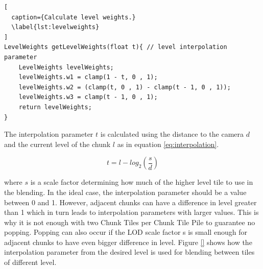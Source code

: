 \begin{lstlisting}[
  caption={Calculate level weights.} 
  \label{lst:levelweights}
]
LevelWeights getLevelWeights(float t){ // level interpolation parameter
	LevelWeights levelWeights;
	levelWeights.w1 = clamp(1 - t, 0 , 1);
	levelWeights.w2 = (clamp(t, 0 , 1) - clamp(t - 1, 0 , 1));
	levelWeights.w3 = clamp(t - 1, 0 , 1);
	return levelWeights;
}
\end{lstlisting}

The interpolation parameter $t$ is calculated using the distance to the camera $d$ and the current level of the chunk $l$ as in equation \ref{eq:interpolation}.

\begin{equation}
\label{eq:interpolation}
t = l-log_2(\frac{s}{d})
\end{equation}

where $s$ is a scale factor determining how much of the higher level tile to use in the blending. In the ideal case, the interpolation parameter should be a value between 0 and 1. However, adjacent chunks can have a difference in level greater than 1 which in turn leads to interpolation parameters with larger values. This is why it is not enough with two Chunk Tiles per Chunk Tile Pile to guarantee no popping. Popping can also occur if the LOD scale factor s is small enough for adjacent chunks to have even bigger difference in level. Figure \ref{} shows how the interpolation parameter from the desired level is used for blending between tiles of different level.

